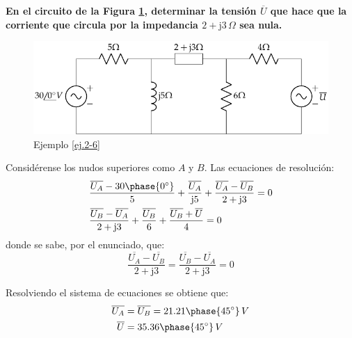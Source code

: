 	\vspace{4mm}
	\begin{example}\label{ej.2-6}
		\textbf{En el circuito de la Figura \ref{fig.ejercicio6_tema2}, determinar la tensión $\overline{U}$ que hace que la corriente que circula por la impedancia $2+\mathrm{j}3\,\Omega$ sea nula.}
		\begin{figure}[H]
			\centering
			\includegraphics[width=0.6\linewidth]{../figs/ej6_BT2.pdf}
			\caption{Ejemplo \ref{ej.2-6}}
			\label{fig.ejercicio6_tema2}
		\end{figure}
		
		Considérense los nudos superiores como $A$ y $B$. Las ecuaciones de resolución:
		\begin{align*}
		    & \dfrac{\overline{U_A}-30\phase{0^\circ}}{5}+\dfrac{\overline{U_A}}{\mathrm{j}5}+\dfrac{\overline{U_A}-\overline{U_B}}{2+\mathrm{j}3} = 0\\
		    & \dfrac{\overline{U_B}-\overline{U_A}}{2+\mathrm{j}3}+ \dfrac{\overline{U_B}}{6}+\dfrac{\overline{U_B}+\overline{U}}{4} = 0
		\end{align*}
		donde se sabe, por el enunciado, que:
		\begin{equation*}
		    \dfrac{\overline{U_A}-\overline{U_B}}{2+\mathrm{j}3}= \dfrac{\overline{U_B}-\overline{U_A}}{2+\mathrm{j}3} = 0
		\end{equation*}
		
		Resolviendo el sistema de ecuaciones se obtiene que:
		\begin{align*}
		    \overline{U_A}&=\overline{U_B}=21.21\phase{45^\circ}\,V\\
		    \overline{U}&=35.36\phase{45^\circ}\,V
		\end{align*}
		

\end{example}
